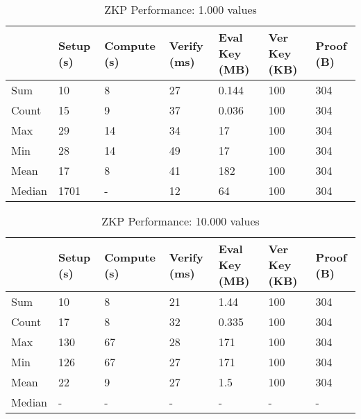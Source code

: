 \begin{table}[!htb]
\centering
\begin{tabular}{|l|l|l|l|l|l|l|}
\hline
 & Setup (s) & Compute (s) & Verify (ms) & Eval Key (MB) & Ver Key (KB) & Proof (B)  \\ \hline
 Sum & 10 & 8 & 27 & 0.144 & 100 & 304 \\ \hline
 Count & 15 & 9 & 37 & 0.036 & 100 & 304 \\ \hline
 Max & 29 & 14 & 34 & 17 & 100 & 304 \\ \hline
 Min & 28 & 14 & 49 & 17 & 100 & 304 \\ \hline
 Mean & 17 & 8 & 41 & 182 & 100 & 304 \\ \hline
 Median & 1701 & - & 12 & 64 & 100 & 304 \\ \hline
\end{tabular}
\captionsetup{format=hang, justification=centering}
\caption{ZKP Performance: 1.000 values}
\label{table:zkp_02}
\end{table}

\begin{table}[!htb]
\centering
\begin{tabular}{|l|l|l|l|l|l|l|}
\hline
 & Setup (s) & Compute (s) & Verify (ms) & Eval Key (MB) & Ver Key (KB) & Proof (B)  \\ \hline
 Sum & 10 & 8 & 21 & 1.44 & 100 & 304 \\ \hline
 Count & 17 & 8 & 32 & 0.335 & 100 & 304 \\ \hline
 Max & 130 & 67 & 28 & 171 & 100 & 304 \\ \hline
 Min & 126 & 67 & 27 & 171 & 100 & 304 \\ \hline
 Mean & 22 & 9 & 27 & 1.5 & 100 & 304 \\ \hline
 Median & - & - & - & - & - & - \\ \hline
\end{tabular}
\captionsetup{format=hang, justification=centering}
\caption{ZKP Performance: 10.000 values}
\label{table:zkp_03}
\end{table}

